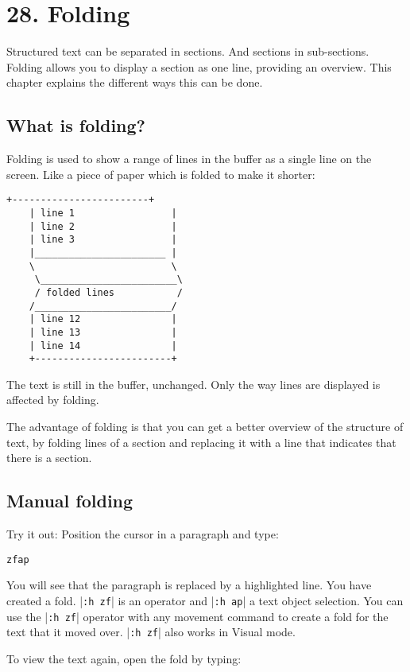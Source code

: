 \section{28. Folding}
Structured text can be separated in sections.  And sections in sub-sections.
Folding allows you to display a section as one line, providing an overview.
This chapter explains the different ways this can be done.
\subsection{What is folding?}
Folding is used to show a range of lines in the buffer as a single line on the screen.
Like a piece of paper which is folded to make it shorter:

\begin{Verbatim}[samepage=true]
    +------------------------+
    | line 1                 |
    | line 2                 |
    | line 3                 |
    |_______________________ |
    \                        \
     \________________________\
     / folded lines           /
    /________________________/
    | line 12                |
    | line 13                |
    | line 14                |
    +------------------------+
\end{Verbatim}

The text is still in the buffer, unchanged.
Only the way lines are displayed is affected by folding.

The advantage of folding is that you can get a better overview of the structure of text, by folding lines of a section and replacing it with a line that indicates that there is a section.
\subsection{Manual folding}
Try it out: Position the cursor in a paragraph and type:

\begin{Verbatim}[samepage=true]
 zfap
\end{Verbatim}

You will see that the paragraph is replaced by a highlighted line.
You have created a fold.
|\texttt{:h zf}| is an operator and |\texttt{:h ap}| a text object selection.
You can use the |\texttt{:h zf}| operator with any movement command to create a fold for the text that it moved over.
|\texttt{:h zf}| also works in Visual mode.

To view the text again, open the fold by typing:

